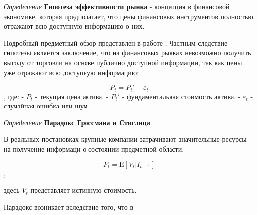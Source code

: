 \textit{Определение} \textbf{Гипотеза эффективности рынка} -  концепция в финансовой экономике, которая предполагает, что цены финансовых инструментов  полностью отражают всю доступную информацию о них. 

Подробный предметный обзор представлен в работе \cite{архипов2007предпосылки}. Частным следствие гипотезы является заключение, что на финансовых рынках невозможно получить выгоду от торговли на основе публично доступной информации, так как цены уже отражают всю доступную информацию:

\[ P_t = P_t' + \varepsilon_t \]
, где:
- \( P_t \) - текущая цена актива.
- \( P_t' \) - фундаментальная стоимость актива.
- \( \varepsilon_t \) - случайная ошибка или шум.


\textit{Определение} \textbf{Парадокс Гроссмана и Стиглица} \cite{grossman1980impossibility}



В реальных постановках крупные компании затрачивают значительные ресурсы на получение информаци о состоянии предметной области.


$$
    P_t = \mathrm{E}[V_t|I_{t-1}]
$$,

здесь $V_t$ представляет истинную стоимость.




Парадокс возникает вследствие того, что в $$


